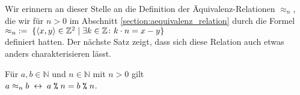 \noindent
Wir erinnern an dieser Stelle an die Definition der Äquivalenz-Relationen $\approx_n$, die wir für 
$n > 0$ im Abschnitt \ref{section:aequivalenz_relation} durch die Formel
\\[0.2cm]
\hspace*{1.3cm}
 $\approx_n \;:=\; \{ \pair(x,y) \in \mathbb{Z}^2 \mid \exists k \in \mathbb{Z} \colon k \cdot n = x - y \}$
\\[0.2cm]
definiert hatten.  Der nächste Satz zeigt, dass sich diese Relation auch etwas anders charakterisieren
lässt. 

\begin{Satz}
Für $a,b \in \mathbb{N}$ und $n \in \mathbb{N}$ mit $n > 0$ gilt
\\[0.2cm]
\hspace*{1.3cm}
$a \approx_n b \;\leftrightarrow\; a \;\texttt{\%}\; n = b \;\texttt{\%}\; n$.
\end{Satz}
  
